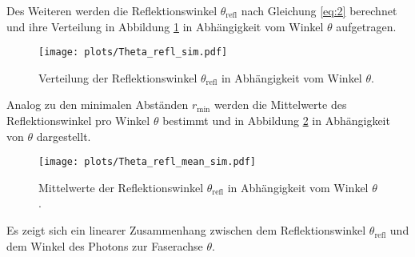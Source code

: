Des Weiteren werden die Reflektionswinkel $\theta_{\mathrm{refl}}$ nach Gleichung \eqref{eq:2} berechnet und ihre Verteilung in Abbildung \ref{fig:Theta_refl_sim} in Abhängigkeit vom Winkel $\theta$ aufgetragen.
\begin{figure}
    \centering
    \texttt{[image: plots/Theta\_refl\_sim.pdf]}
    \caption{Verteilung der Reflektionswinkel $\theta_{\mathrm{refl}}$ in Abhängigkeit vom Winkel $\theta$. }
    \label{fig:Theta_refl_sim}
\end{figure}
\FloatBarrier
Analog zu den minimalen Abständen $r_{\mathrm{min}}$ werden die Mittelwerte des Reflektionswinkel pro Winkel $\theta$ bestimmt und in Abbildung \ref{fig:Theta_refl_mean_sim} in Abhängigkeit von $\theta$ dargestellt.
\begin{figure}
    \centering
    \texttt{[image: plots/Theta\_refl\_mean\_sim.pdf]}
    \caption{Mittelwerte der Reflektionswinkel $\theta_{\mathrm{refl}}$ in Abhängigkeit vom Winkel $\theta$. }
    \label{fig:Theta_refl_mean_sim}
\end{figure}
\FloatBarrier
Es zeigt sich ein linearer Zusammenhang zwischen dem Reflektionswinkel $\theta_{\mathrm{refl}}$ und dem Winkel des Photons zur Faserachse $\theta$.
